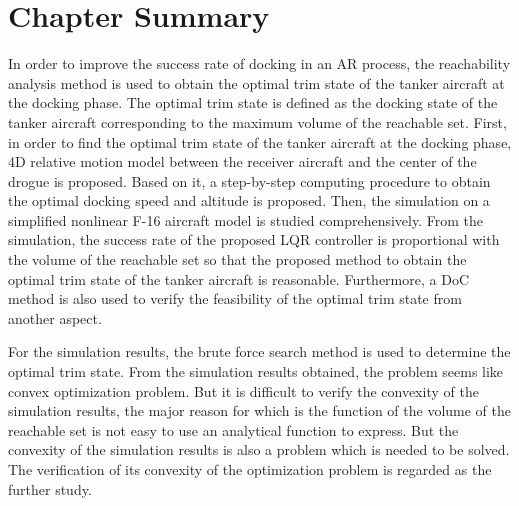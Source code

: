 \section{Chapter Summary}

In order to improve the success rate of docking in an AR process, the
reachability analysis method is used to obtain the optimal trim state of the
tanker aircraft at the docking phase. The optimal trim state is defined as
the docking state of the tanker aircraft corresponding to the maximum volume
of the reachable set. First, in order to find the optimal trim state of the
tanker aircraft at the docking phase, 4D relative motion model between the
receiver aircraft and the center of the drogue is proposed. Based on it, a
step-by-step computing procedure to obtain the optimal docking speed and
altitude is proposed. Then, the simulation on a simplified nonlinear F-16
aircraft model is studied comprehensively. From the simulation, the success
rate of the proposed LQR controller is proportional with the volume of the
reachable set so that the proposed method to obtain the optimal trim state
of the tanker aircraft is reasonable. Furthermore, a DoC method is also used
to verify the feasibility of the optimal trim state from another aspect.

For the simulation results, the brute force search method is used to
determine the optimal trim state. From the simulation results obtained, the
problem seems like convex optimization problem. But it is difficult to
verify the convexity of the simulation results, the major reason for which
is the function of the volume of the reachable set is not easy to use an
analytical function to express. But the convexity of the simulation results
is also a problem which is needed to be solved. The verification of its
convexity of the optimization problem is regarded as the further study.

